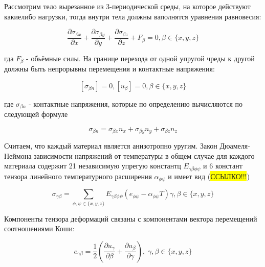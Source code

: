 Рассмотрим тело вырезанное из 3-периодической среды, на которое действуют какиелибо нагрузки, тогда внутри тела должны ваполнятся уравнения
равновесия:

\begin{equation}
    \label{elhp:eq1}
    \frac{\partial \sigma_{\beta x}}{\partial x} +
    \frac{\partial \sigma_{\beta y}}{\partial y} +
    \frac{\partial \sigma_{\beta z}}{\partial z} +
    F_{\beta} = 0,
    \beta \in \{x,y,z\} 
\end{equation}

гда 
$F_{\beta}$ 
- обьёмные силы. На границе перехода от одной упругой чреды к другой должны быть непрорывны перемещения и контактные напряжения:

\begin{equation}
    \label{elhp:eq2}
    \left[ \sigma_{\beta n} \right] = 0, \left[ u_{\beta} \right] = 0, \beta \in \{x,y,z\} 
\end{equation}

где $\sigma_{\beta n}$ -  контактные напряжения, которые по определению вычисляются по следующей формуле

\begin{equation}
    \label{elhp:eq3}
    \sigma_{\beta n} = 
    \sigma_{\beta x} n_x +
    \sigma_{\beta y} n_y +
    \sigma_{\beta z} n_z
\end{equation}

Считаем, что каждый материал является анизотропно уругим. Закон Дюамеля-Неймона зависимости напряжений от температуры в общем случае для
каждого материала содержит 21 независимую упрегую константц 
$E_{\gamma\beta\phi\psi}$ 
и 6 констант тензора линейного температурного 
расширения 
$\alpha_{\phi\psi}$ 
и имеет вид (\colorbox{yellow}{ССЫЛКО!!!})

\begin{equation}
    \label{elhp:eq4}
    \sigma_{\gamma \beta} = \sum_{ \phi, \psi \in \{x,y,z\} } E_{\gamma\beta\phi\psi} 
    \left( e_{\phi\psi} - \alpha_{\phi\psi}T \right) \gamma,\beta \in \{x,y,z\} 
\end{equation}

Компоненты тензора деформаций связаны с компонентами вектора перемещений соотношениями Коши:

\begin{equation}
    \label{elhp:eq5}
    e_{\gamma\beta} = \frac{1}{2} \left( \frac{\partial u_{\gamma}}{\partial \beta} + \frac{\partial u_{\beta}}{\partial \gamma}  \right) 
    ,\; \gamma,\beta \in \{x,y,z\} 
\end{equation}

